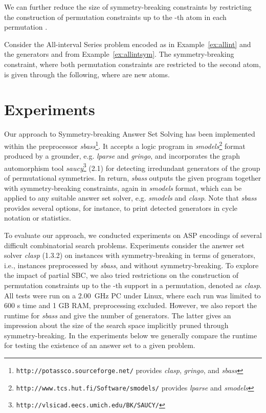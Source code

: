 \documentclass[envcountsame]{llncs}
\newcommand{\systemname}[1]{\emph{#1}}
\begin{document}
We can further reduce the size of symmetry-breaking constraints by restricting the construction of permutation constraints up to the -th atom in each permutation \cite{almasa03a}.
\begin{example}
Consider the All-interval Series problem encoded as in Example~\ref{ex:allint} and the generators  and  from Example~\ref{ex:allintsym}.
The symmetry-breaking constraint, where both permutation constraints are restricted to the second atom, is given through the following, where  are new atoms.

\end{example}

\section{Experiments \label{sec:exp}}
Our approach to Symmetry-breaking Answer Set Solving has been implemented within the preprocessor \systemname{sbass}\footnote{\texttt{http://potassco.sourceforge.net/} provides \systemname{clasp}, \systemname{gringo}, and \systemname{sbass}}. It accepts a logic program in \systemname{smodels}\footnote{\texttt{http://www.tcs.hut.fi/Software/smodels/} provides \systemname{lparse} and \systemname{smodels}} format~\cite{lparseManual} produced by a grounder, e.g. \systemname{lparse} and \systemname{gringo}, and incorporates the graph automorphism tool \systemname{saucy}\footnote{\texttt{http://vlsicad.eecs.umich.edu/BK/SAUCY/}} (2.1) for detecting irredundant generators of the group of permutational symmetries. In return, \systemname{sbass} outputs the given program together with symmetry-breaking constraints, again in \systemname{smodels} format, which can be applied to any suitable answer set solver, e.g. \systemname{smodels} and \systemname{clasp}. Note that \emph{sbass} provides several options, for instance, to print detected generators in cycle notation or statistics.

To evaluate our approach, we conducted experiments on ASP encodings of several difficult combinatorial search problems. Experiments consider the answer set solver \systemname{clasp} (1.3.2) on instances with symmetry-breaking in terms of generators, i.e., instances preprocessed by \systemname{sbass}, and without symmetry-breaking. To explore the impact of partial SBC, we also tried restrictions on the construction of permutation constraints up to the -th support in a permutation, denoted as \systemname{clasp}.
All tests were run on a 2.00~GHz PC under Linux, where each run was limited to 600 s time and 1 GB RAM, preprocessing excluded. However, we also report the runtime for \systemname{sbass} and give the number of generators. The latter gives an impression about the size of the search space implicitly pruned through symmetry-breaking.
In the experiments below we generally compare the runtime for testing the existence of an answer set to a given problem.
\end{document}
